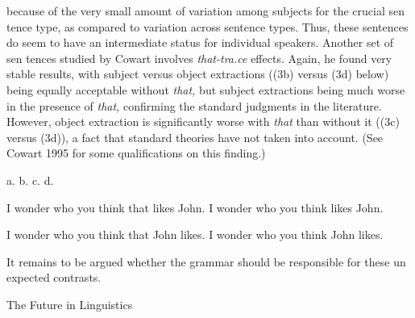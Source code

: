 \begin{styleTextbody}
because of the very small amount of variation among subjects for the crucial sen\- tence type, as compared to variation across sentence types. Thus, these sentences do seem to have an intermediate status for individual speakers. Another set of sen\- tences studied by Cowart involves \textit{that-tra.ce}\textit{ }effects. Again, he found very stable results, with subject versus object extractions ((3b) versus (3d) below) being equally acceptable without \textit{that,}\textit{ }but subject extractions being much worse in the presence of \textit{that,}\textit{ }confirming the standard judgments in the literature. However, object extraction is significantly worse with \textit{that}\textit{ }than without it ((3c) versus (3d)), a fact that standard theories have not taken into account. (See Cowart 1995 for some qualifications on this finding.)
\end{styleTextbody}


\begin{multicols}{2}
\begin{listWWNumxivleveli}
\item 
\begin{styleStandard}
a. b. c. d.
\end{styleStandard}


\end{listWWNumxivleveli}
\begin{styleTextbody}
I wonder who you think that likes John. I wonder who you think likes John.
\end{styleTextbody}


\begin{styleTextbody}
I wonder who you think that John likes. I wonder who you think John likes.
\end{styleTextbody}


\end{multicols}
\begin{styleTextbody}
It remains to be argued whether the grammar should be responsible for these un\- expected contrasts.
\end{styleTextbody}


\begin{styleHeadingvii}
The Future in Linguistics
\end{styleHeadingvii}


